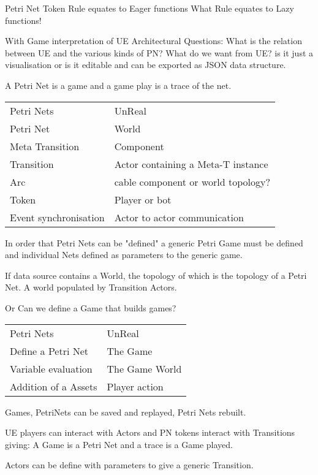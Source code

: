 Petri Net Token Rule equates to Eager functions What Rule equates to Lazy functions!


With Game interpretation of UE  Architectural Questions:
What is the relation between UE and the various kinds of PN? What do we want from UE? is it just a visualisation or is it editable and can be exported as JSON data structure.


A Petri Net is a game and a game play is a trace of the net.

\begin{center}
\begin{tabular}{ll}
Petri Nets & UnReal \\
Petri Net &  World \\
Meta Transition &  Component \\
Transition &  Actor containing a Meta-T instance  \\
Arc & cable component or world topology? \\
Token & Player or bot \\
Event synchronisation & Actor to actor communication \\
\end{tabular}
\end{center}

In order that Petri Nets can be "defined" a generic Petri Game must be defined and  individual Nets defined as parameters to the generic game.
 
If data source contains a World, the topology of which is the topology of a Petri Net. A world populated by Transition Actors.
 
 
 Or Can we define a Game that builds games?
 
 \begin{center}
 \begin{tabular}{ll}
Petri Nets & UnReal \\
Define a Petri Net &  The Game \\
Variable evaluation & The Game World \\
Addition of a Assets &  Player action \\
\end{tabular}
 \end{center}
 
 Games, PetriNets can be saved and replayed, Petri Nets rebuilt.


UE players can interact with Actors and 
PN tokens interact with Transitions  giving: A Game  is a Petri Net and  a trace is a Game played.

Actors can be define with parameters to give a generic Transition.

